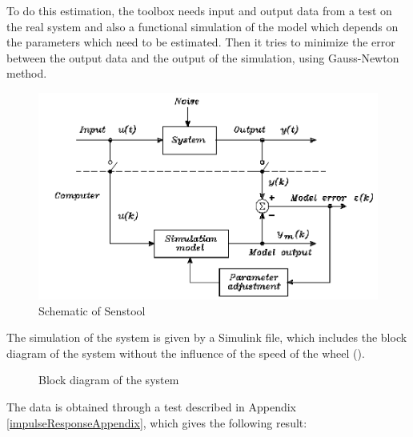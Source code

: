 To do this estimation, the toolbox needs input and output data from a test on the real system and also a functional simulation of the model which depends on the parameters which need to be estimated. Then it tries to minimize the error between the output data and the output of the simulation, using Gauss-Newton method.

\begin{figure}[H]
	\centering
	\includegraphics[scale=0.4]{figures/SensToolSchema}
	\caption{Schematic of Senstool}
	\label{SensToolSchema}
\end{figure}
%
The simulation of the system is given by a Simulink file, which includes the block diagram of the system without the influence of the speed of the wheel ().
%
\begin{figure}[H]
	
		\centering
	\caption{Block diagram of the system}
	\label{blockDiagramSenseTool}
\end{figure}

The data is obtained through a test described in Appendix \ref{impulseResponseAppendix}, which gives the following result:

